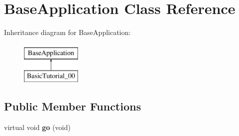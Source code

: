 \hypertarget{class_base_application}{
\section{BaseApplication Class Reference}
\label{class_base_application}
}
Inheritance diagram for BaseApplication:\begin{figure}[H]
\begin{center}
\leavevmode
\includegraphics[height=2.000000cm]{class_base_application}
\end{center}
\end{figure}
\subsection*{Public Member Functions}
\begin{DoxyCompactItemize}
\item 
\hypertarget{class_base_application_a8a14a65a29118dd75173aa68678a05e1}{
virtual void {\bfseries go} (void)}
\label{class_base_application_a8a14a65a29118dd75173aa68678a05e1}

\end{DoxyCompactItemize}
